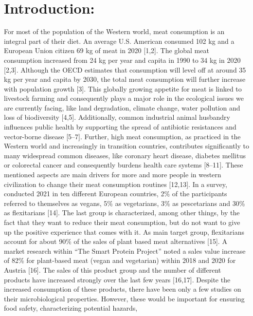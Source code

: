 \documentclass[preprint,3p,
a4paper]{elsarticle} %
\begin{document}
\hypertarget{introduction}{%
\section{Introduction:}\label{introduction}}

For most of the population of the Western world, meat consumption is an
integral part of their diet. An average U.S. American consumed 102 kg
and a European Union citizen 69 kg of meat in 2020 {[}1,2{]}. The global
meat consumption increased from 24 kg per year and capita in 1990 to 34
kg in 2020 {[}2,3{]}. Although the OECD estimates that consumption will
level off at around 35 kg per year and capita by 2030, the total meat
consumption will further increase with population growth {[}3{]}. This
globally growing appetite for meat is linked to livestock farming and
consequently plays a major role in the ecological issues we are
currently facing, like land degradation, climate change, water pollution
and loss of biodiversity {[}4,5{]}. Additionally, common industrial
animal husbandry influences public health by supporting the spread of
antibiotic resistances and vector-borne disease {[}5--7{]}. Further,
high meat consumption, as practiced in the Western world and
increasingly in transition countries, contributes significantly to many
widespread common diseases, like coronary heart disease, diabetes
mellitus or colorectal cancer and consequently burdens health care
systems {[}8--11{]}. These mentioned aspects are main drivers for more
and more people in western civilization to change their meat consumption
routines {[}12,13{]}. In a survey, conducted 2021 in ten different
European countries, 2\% of the participants referred to themselves as
vegans, 5\% as vegetarians, 3\% as pescetarians and 30\% as flexitarians
{[}14{]}. The last group is characterized, among other things, by the
fact that they want to reduce their meat consumption, but do not want to
give up the positive experience that comes with it. As main target
group, flexitarians account for about 90\% of the sales of plant based
meat alternatives {[}15{]}. A market research within ``The Smart Protein
Project'' noted a sales value increase of 82\% for plant-based meat
(vegan and vegetarian) within 2018 and 2020 for Austria {[}16{]}. The
sales of this product group and the number of different products have
increased strongly over the last few years {[}16,17{]}. Despite the
increased consumption of these products, there have been only a few
studies on their microbiological properties. However, these would be
important for ensuring food safety, characterizing potential hazards,
\end{document}
